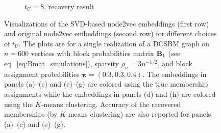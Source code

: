 \documentclass[10pt,journal,compsoc]{IEEEtran}
\newcommand{\M}[1]{{{\mathbf{\MakeUppercase{#1}}}}}
\numberwithin{equation}{section}
\begin{document}
\begin{figure}
\begin{subfigure}{.24\columnwidth}
\caption{$t_U = 8$, recovery result}
\end{subfigure}
\caption{Visualizations of the SVD-based node2vec embeddings (first row) and original node2vec embeddings (second row) for different choices of $t_U$. The plots are for a single realization of a DCSBM graph on $n = 600$ vertices with block probabilities matrix $\M B_1$ (see eq.~\eqref{eq:Bmat_simulations}), sparsity $\rho_n = 3n^{-1/2}$, and block assignment probabilities $\bm{\pi} = (0.3, 0.3, 0.4)$. The embeddings in panels (a)--(c) and (e)--(g) are colored using the true membership assignments while the embeddings in panels (d) and (h) are colored using the $K$-means clustering.
Accuracy of the recovered memberships (by $K$-means clustering) are also reported for panels 
(a)--(c) and (e)--(g).}
\label{f:embd:dcsbm}
\end{figure}
\end{document}
